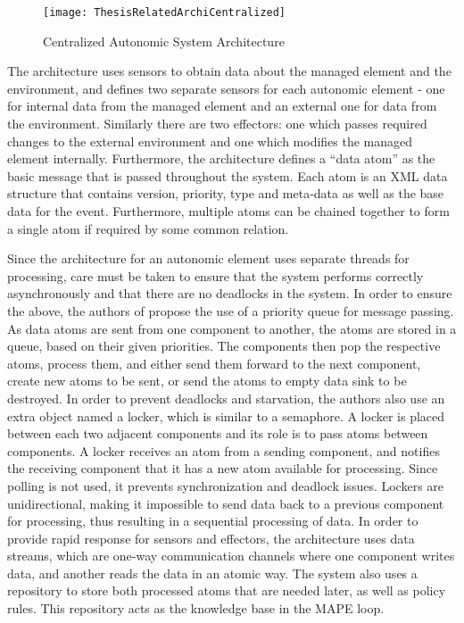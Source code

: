 \begin{figure}
	\centering
		\texttt{[image: ThesisRelatedArchiCentralized]}
	\caption{Centralized Autonomic System Architecture}
	\label{fig:centralizedarchi}
\end{figure}

The architecture uses sensors to obtain data about the managed element and the environment, and defines two separate sensors for each autonomic element - one for internal data from the managed element and an external one for data from the environment. Similarly there are two effectors: one which passes required changes to the external environment and one which modifies the managed element internally. Furthermore, the architecture defines a ``data atom'' as the basic message that is passed throughout the system. Each atom is an XML data structure that contains version, priority, type and meta-data as well as the base data for the event. Furthermore, multiple atoms can be chained together to form a single atom if required by some common relation.

Since the architecture for an autonomic element uses separate threads for processing, care must be taken to ensure that the system performs correctly asynchronously and that there are no deadlocks in the system. In order to ensure the above, the authors of \cite{related:architecture:autonomicelement} propose the use of a priority queue for message passing. As data atoms are sent from one component to another, the atoms are stored in a queue, based on their given priorities. The components then pop the respective atoms, process them, and either send them forward to the next component, create new atoms to be sent, or send the atoms to empty data sink to be destroyed. In order to prevent deadlocks and starvation, the authors also use an extra object named a locker, which is similar to a semaphore. A locker is placed between each two adjacent components and its role is to pass atoms between components. A locker receives an atom from a sending component, and notifies the receiving component that it has a new atom available for processing. Since polling is not used, it prevents synchronization and deadlock issues. Lockers are unidirectional, making it impossible to send data back to a previous component for processing, thus resulting in a sequential processing of data. In order to provide rapid response for sensors and effectors, the architecture uses data streams, which are one-way communication channels where one component writes data, and another reads the data in an atomic way. The system also uses a repository to store both processed atoms that are needed later, as well as policy rules. This repository acts as the knowledge base in the MAPE loop.


